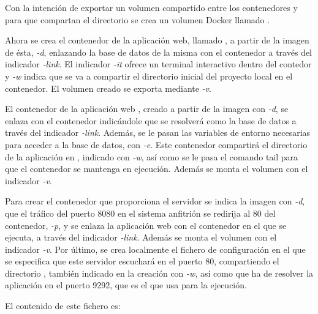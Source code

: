 Con la intención de exportar un volumen compartido entre los contenedores  y  para que compartan el directorio  se crea un volumen Docker llamado .

Ahora se crea el contenedor de la aplicación web, llamado , a partir de la imagen de ésta, \textit{\--d}, enlazando la base de datos de la misma con el contenedor  a través del indicador \textit{\--link}. El indicador \textit{-it} ofrece un terminal interactivo dentro del contedor y \textit{-w} indica que se va a compartir el directorio inicial del proyecto local en el contenedor. El volumen creado se exporta mediante \textit{-v}.

El contenedor de la aplicación web , creado a partir de la imagen  con \textit{\--d}, se enlaza con el contenedor  indicándole que se resolverá como la base de datos a través del indicador \textit{\--link}. Además, se le pasan las variables de entorno necesarias para acceder a la base de datos, con \textit{\--e}. Este contenedor compartirá el directorio de la aplicación en , indicado con \textit{\--w}, así como se le pasa el comando tail para que el contenedor se mantenga en ejecución. Además se monta el volumen  con el indicador \textit{\--v}.

Para crear el contenedor  que proporciona el servidor  se indica la imagen con \textit{\--d}, que el tráfico del puerto 8080 en el sistema anfitrión se redirija al 80 del contenedor, \textit{\--p}, y se enlaza la aplicación web con el contenedor en el que se ejecuta, a través del indicador \textit{\--link}. Además se monta el volumen  con el indicador \textit{\--v}. Por último, se crea localmente el fichero de configuración  en el que se especifica que este servidor escuchará en el puerto 80, compartiendo el directorio , también indicado en la creación con \textit{\--w}, así como que ha de resolver la aplicación en el puerto 9292, que es el que usa  para la ejecución.  

El contenido de este fichero es: 
\begin{codelisting}
\label{code:nginxconf}
\end{codelisting}

